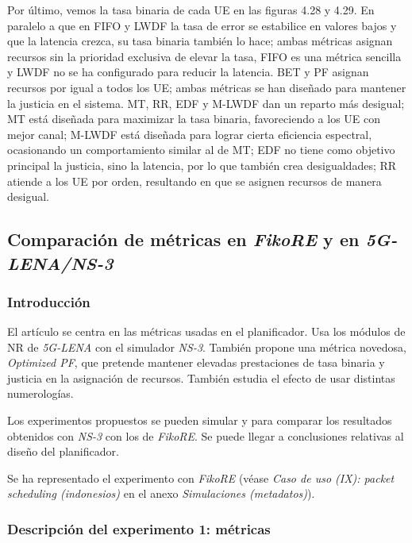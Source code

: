 \documentclass[12pt]{report} %
\begin{document}
Por último, vemos la tasa binaria de cada UE en las figuras 4.28 y 4.29.
En paralelo a que en FIFO y LWDF la tasa de error se estabilice en valores bajos y que la latencia crezca, su tasa binaria también lo hace;
ambas métricas asignan recursos sin la prioridad exclusiva de elevar la tasa,
FIFO es una métrica sencilla y LWDF no se ha configurado para reducir la latencia.
BET y PF asignan recursos por igual a todos los UE;
ambas métricas se han diseñado para mantener la justicia en el sistema.
MT, RR, EDF y M-LWDF dan un reparto más desigual;
MT está diseñada para maximizar la tasa binaria, favoreciendo a los UE con mejor canal;
M-LWDF está diseñada para lograr cierta eficiencia espectral, ocasionando un comportamiento similar al de MT;
EDF no tiene como objetivo principal la justicia, sino la latencia, por lo que también crea desigualdades;
RR atiende a los UE por orden, resultando en que se asignen recursos de manera desigual.

\subsection{Comparación de métricas en \textit{FikoRE} y en \textit{5G-LENA/NS-3}}

\subsubsection{Introducción}

El artículo \cite{RefWorks:67} se centra en las métricas usadas en el planificador.
Usa los módulos de NR de \textit{5G-LENA} con el simulador \textit{NS-3}.
También propone una métrica novedosa, \textit{Optimized PF}, que pretende mantener elevadas prestaciones de tasa binaria y justicia en la asignación de recursos.
También estudia el efecto de usar distintas numerologías.

Los experimentos propuestos se pueden simular y para comparar los resultados obtenidos con \textit{NS-3} con los de \textit{FikoRE}.
Se puede llegar a conclusiones relativas al diseño del planificador.

Se ha representado el experimento con \textit{FikoRE}
(véase \textit{Caso de uso (IX): packet scheduling (indonesios)} en el anexo \textit{Simulaciones (metadatos)}).

\subsubsection{Descripción del experimento 1: métricas}
\end{document}
